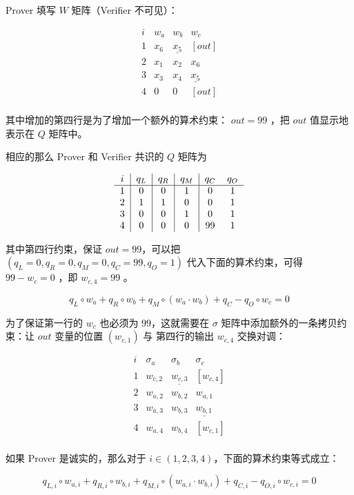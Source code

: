 Prover 填写 \(W\) 矩阵（Verifier 不可见）：

\[
\begin{array}{c|c|c|c|}
i & w_a & w_b & w_c  \\
\hline
1 & \boxed{x_6} & \underline{x_5} & [out] \\
2 & x_1 & x_2 & \boxed{x_6} \\
3 & x_3 & x_4 & \underline{x_5} \\
4 & 0 & 0 & [out] \\
\end{array}
\]

其中增加的第四行是为了增加一个额外的算术约束： \(out=99\) ，把 \(out\)
值显示地表示在 \(Q\) 矩阵中。

相应的那么 Prover 和 Verifier 共识的 \(Q\) 矩阵为

\[
\begin{tabular}{c|c|c|c|cc}
    $i$ & $q_L$ & $q_R$ & $q_M$ & $q_C$ & $q_O$ \\
    \hline 1 & 0 & 0 & 1 & 0 & 1 \\
    2 & 1 & 1 & 0 & 0 & 1 \\
    3 & 0 & 0 & 1 & 0 & 1 \\
    4 & 0 & 0 & 0 & 99 & 1
\end{tabular}
\]

其中第四行约束，保证 \(out=99\)，可以把
\((q_L=0, q_R=0,q_M=0,q_C=99,q_O=1)\) 代入下面的算术约束，可得
\(99-w_c = 0\) ，即 \(w_{c,4}=99\) 。

\[
q_L \circ w_a + q_R \circ w_b + q_M\circ(w_a\cdot w_b) + q_C -  q_O\circ w_c = 0
\]

为了保证第一行的 \(w_c\) 也必须为 \(99\)，这就需要在 \(\sigma\)
矩阵中添加额外的一条拷贝约束：让 \(out\) 变量的位置 \((w_{c,1})\) 与
第四行的输出 \(w_{c,4}\) 交换对调：

\[
\begin{array}{c|c|c|c|}
i & \sigma_a & \sigma_b & \sigma_c  \\
\hline
1 & \boxed{w_{c,2}} & \underline{w_{c,3}} & [w_{c,4}] \\
2 & w_{a,2} & w_{b,2} & \boxed{w_{a,1}} \\
3 & w_{a,3} & w_{b,3} & \underline{w_{b,1}} \\
4 & w_{a,4} & w_{b,4} & [w_{c,1}]\\
\end{array}
\]

如果 Prover 是诚实的，那么对于
\(i\in(1,2,3,4)\)，下面的算术约束等式成立：

\[
q_{L,i} \circ w_{a,i} + q_{R,i} \circ w_{b,i} + q_{M,i}\circ(w_{a,i}\cdot w_{b,i}) + q_{C,i} -  q_{O,i}\circ w_{c,i} = 0
\]

